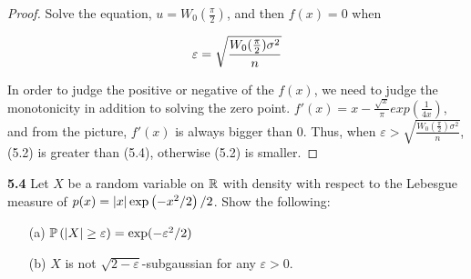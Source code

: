 \begin{proof}
	Solve the equation, $u = W_0(\frac \pi 2)$, and then $f(x) = 0$ when

	\begin{equation}
	\begin{aligned}
	\notag
\varepsilon = \sqrt{\frac {W_0(\frac {\pi} {2}) \sigma^2} {n}}
	\end{aligned}	
	\end{equation}

	In order to judge the positive or negative of the $f(x)$, we need to judge the monotonicity in addition to solving the zero point. $f'(x) = x - \frac {\sqrt x}{\pi} exp(\frac 1 {4x})$, and from the picture, $f'(x)$ is always bigger than 0. Thus, when $\varepsilon > \sqrt{\frac {W_0(\frac {\pi} {2}) \sigma^2} {n}}$, (5.2) is greater than (5.4), otherwise (5.2) is smaller.


\end{proof}




\noindent\textbf{5.4} Let $X$ be a random variable on $\mathbb{R}$ with density with respect to the Lebesgue measure of $p(x)= \left| x \right|\exp\left(-x^2/2\right)/2$. Show the following:
\begin{enumerate}
	\item[(a)] $\mathbb{P} \left(\left| X \right|\ge \varepsilon\right) = \exp(-\varepsilon^2/2)$
	\item[(b)] $X$ is not $\sqrt{2-\varepsilon}$-subgaussian for any $\varepsilon>0$.
\end{enumerate}

